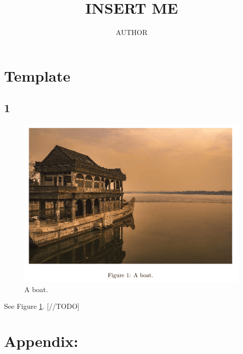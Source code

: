 \documentclass{article}
\title{INSERT ME}
\author{AUTHOR}
\date{}
\begin{document}
\maketitle

\tableofcontents

\clearpage
\section{Template}
\subsection{1}
\begin{figure}[h]
  \includegraphics[width=\linewidth]{boat.png}
  \caption{A boat.}
  \label{fig:boat}
\end{figure}
See Figure \ref{fig:boat}.
[//TODO]


\cleardoublepage
\section{Appendix:}
\end{document}

